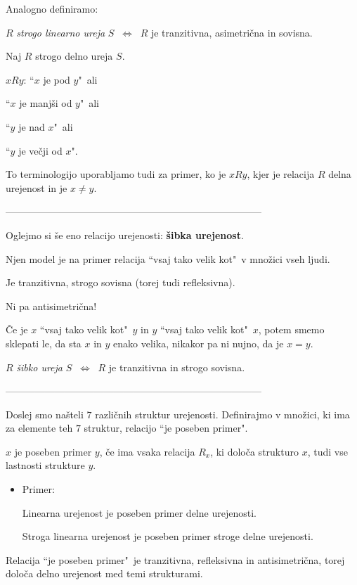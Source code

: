 \documentclass[11pt,paper=b5,footinclude,headinclude]{scrbook} %
\def\cee {{~\Leftrightarrow~}}
\begin{document}
Analogno definiramo:

\medskip
$R$ {\em strogo linearno ureja} $S$ $\cee$ $R$ je tranzitivna, asimetrična in sovisna.

\bigskip

Naj $R$ strogo delno ureja $S$.

$xRy$: ``$x$ je pod  $y$"~ali

``$x$ je manjši od $y$"~ali

``$y$ je nad $x$"~ali

``$y$ je večji od  $x$".


\medskip
To terminologijo uporabljamo tudi za primer, ko je $xRy$, kjer je relacija $R$ delna urejenost in je $x\neq y$.

------------------------------------------------------------------------------

\bigskip

Oglejmo si še eno relacijo urejenosti: \textbf{ šibka urejenost}.

Njen model je na primer relacija ``vsaj tako velik kot"~v množici vseh ljudi.

Je tranzitivna, strogo sovisna (torej tudi refleksivna).

Ni pa antisimetrična!

Če je $x$ ``vsaj tako velik kot"~$y$ in $y$ ``vsaj tako velik kot"~$x$,
potem smemo sklepati le, da sta $x$ in $y$ enako velika, nikakor pa ni nujno, da je $x = y$.

$R$ {\em šibko ureja} $S$ $\cee$ $R$ je tranzitivna in strogo sovisna.

\bigskip

------------------------------------------------------------------------------
\bigskip

Doslej smo našteli $7$ različnih struktur urejenosti.
Definirajmo v množici, ki ima za elemente teh $7$ struktur, relacijo ``je poseben primer".

$x$ je poseben primer $y$, če ima vsaka relacija $R_x$, ki določa strukturo $x$, tudi vse lastnosti strukture $y$.

\begin{itemize}
  \item Primer:

  Linearna urejenost je poseben primer delne urejenosti.

Stroga linearna urejenost je poseben primer stroge delne urejenosti.
\end{itemize}

Relacija ``je poseben primer"~je tranzitivna, refleksivna in antisimetrična, torej določa delno urejenost med temi strukturami.
\end{document}
